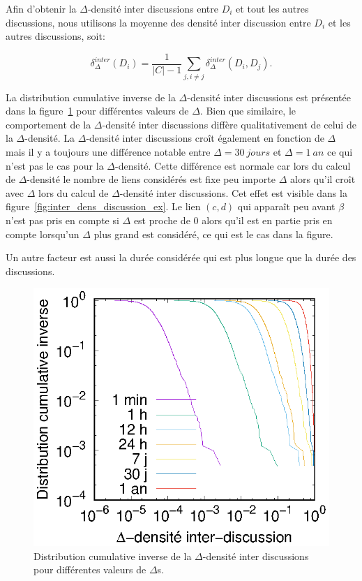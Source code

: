 Afin d'obtenir la $\Delta$-densité inter discussions entre $D_i$ et tout les autres discussions, nous utilisons la moyenne des densité inter discussion entre $D_i$ et les autres discussions, soit:

\begin{equation}
	\delta^{inter}_{\Delta}(D_i) = \frac{1}{|C|-1}\sum_{j,i\ne j} \delta^{inter}_{\Delta}(D_i,D_j).
\end{equation}

La distribution cumulative inverse de la $\Delta$-densité inter discussions est présentée dans la figure~\ref{fig:inter_dens_discussion} pour différentes valeurs de $\Delta$.
Bien que similaire, le comportement de la $\Delta$-densité inter discussions diffère qualitativement de celui de la $\Delta$-densité.
La $\Delta$-densité inter discussions croît également en fonction de $\Delta$ mais il y a toujours une différence notable entre $\Delta= 30\  jours$ et $\Delta= 1\ an$ ce qui n'est pas le cas pour la $\Delta$-densité.
Cette différence est normale car lors du calcul de $\Delta$-densité le nombre de liens considérés est fixe peu importe $\Delta$ alors qu'il croît avec $\Delta$ lors du calcul de $\Delta$-densité inter discussions.
Cet effet est visible dans la figure~\ref{fig:inter_dens_discussion_ex}.
Le lien $(c,d)$ qui apparaît peu avant $\beta$ n'est pas pris en compte si $\Delta$ est proche de $0$ alors qu'il est en partie pris en compte lorsqu'un $\Delta$ plus grand est considéré, ce qui est le cas dans la figure.

Un autre facteur est aussi la durée considérée qui est plus longue que la durée des discussions.
\begin{figure}
\centering
	\includegraphics[width=0.4\linewidth]{img/mailing/inter_delta.eps}
\caption{Distribution cumulative inverse de la $\Delta$-densité inter discussions pour différentes valeurs de $\Delta$s.}
\label{fig:inter_dens_discussion}
\end{figure}

\bigskip

